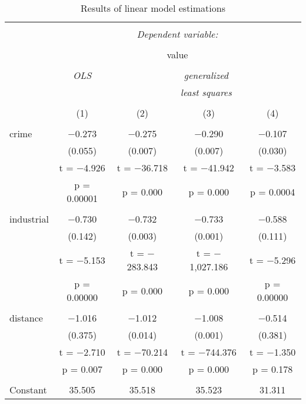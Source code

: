 \documentclass[
  12pt,
]{article}
\begin{document}
\newpage
\begin{table}[htb] \centering 
    \caption{Results of linear model estimations} 
    \label{LS} 
    \small 
    \begin{tabular}{@{\extracolsep{5pt}}lcccc} 
        \\[-1.8ex]\hline 
        \hline \\[-1.8ex] 
        & \multicolumn{4}{c}{\textit{Dependent variable:}} \\ 
        \cline{2-5} 
        \\[-1.8ex] & \multicolumn{4}{c}{value} \\ 
        \\[-1.8ex] & \textit{OLS} & \multicolumn{3}{c}{\textit{generalized}} \\ 
        & \textit{} & \multicolumn{3}{c}{\textit{least squares}} \\ 
        \\[-1.8ex] & (1) & (2) & (3) & (4)\\ 
        \hline \\[-1.8ex] 
        crime & $-$0.273 & $-$0.275 & $-$0.290 & $-$0.107 \\ 
        & (0.055) & (0.007) & (0.007) & (0.030) \\ 
        & t = $-$4.926 & t = $-$36.718 & t = $-$41.942 & t = $-$3.583 \\ 
        & p = 0.00001 & p = 0.000 & p = 0.000 & p = 0.0004 \\ 
        & & & & \\ 
        industrial & $-$0.730 & $-$0.732 & $-$0.733 & $-$0.588 \\ 
        & (0.142) & (0.003) & (0.001) & (0.111) \\ 
        & t = $-$5.153 & t = $-$283.843 & t = $-$1,027.186 & t = $-$5.296 \\ 
        & p = 0.00000 & p = 0.000 & p = 0.000 & p = 0.00000 \\ 
        & & & & \\ 
        distance & $-$1.016 & $-$1.012 & $-$1.008 & $-$0.514 \\ 
        & (0.375) & (0.014) & (0.001) & (0.381) \\ 
        & t = $-$2.710 & t = $-$70.214 & t = $-$744.376 & t = $-$1.350 \\ 
        & p = 0.007 & p = 0.000 & p = 0.000 & p = 0.178 \\ 
        & & & & \\ 
        Constant & 35.505 & 35.518 & 35.523 & 31.311 \\ 

\end{tabular}
\end{table}
\end{document}
